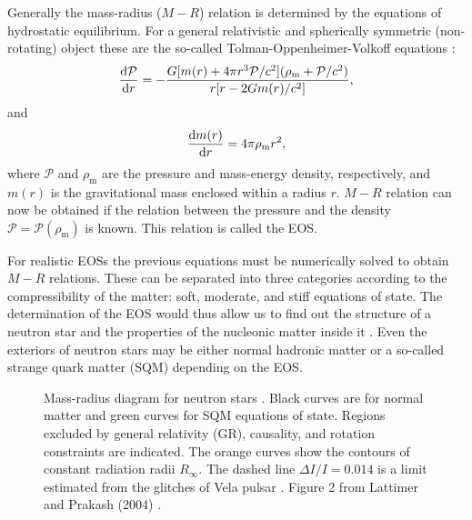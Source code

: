 \documentclass{wihuri}
\def\be{\begin{equation}}
\def\ee{\end{equation}}
\def\d{{\rm d}}
\begin{document}





Generally the mass-radius ($M-R$) relation is determined by the equations of hydrostatic equilibrium. For a general relativistic and spherically symmetric (non-rotating) object %
these are the so-called Tolman-Oppenheimer-Volkoff equations %
\cite{tolman}\cite{oppenheimer}:
\be
 \frac{\d \mathcal{P}}{\d r} = -\frac{G[m(r)+4 \pi r^{3}\mathcal{P}/c^{2}](\rho_{\mathrm{m}} + \mathcal{P}/c^{2})}{r[r-2Gm(r)/c^{2}]},
\ee 
and
\be
 \frac{\d m(r)}{\d r } = 4 \pi \rho_{\mathrm{m}} r^{2},
\ee
where $\mathcal{P}$ and $\rho_{\mathrm{m}}$ are the pressure and mass-energy density, respectively, and $m(r)$ is the gravitational mass enclosed within a radius $r$. $M-R$ relation can now be obtained if the relation between the pressure and the density $\mathcal{P}=\mathcal{P}(\rho_{\mathrm{m}})$ is known. This relation is called the EOS. 


For realistic EOSs the previous equations must be numerically solved to obtain $M-R$ relations. These can be separated into three categories according to the compressibility of the matter: soft, moderate, and stiff equations of state. The determination of the EOS would thus allow us to find out the structure of a neutron star and the properties of the nucleonic matter inside it \cite{akmal}. Even the exteriors of neutron stars may be either normal hadronic matter or a so-called strange quark matter (SQM) depending on the EOS.  

\begin{figure}
\centerline{} 
\caption{Mass-radius diagram for neutron stars \cite{lattimer}. Black curves are for normal matter and green curves for SQM equations of state. Regions excluded by general relativity (GR), causality, and rotation constraints are indicated. The orange curves show the contours of constant radiation radii $R_{\infty}$. The dashed line $\Delta I / I = 0.014$ is a limit estimated from the glitches of Vela pulsar \cite{lattimer2001}. Figure 2 from Lattimer and Prakash (2004) \cite{lattimer}.}  
\label{fig:eos_mr}
\end{figure}
\end{document}

